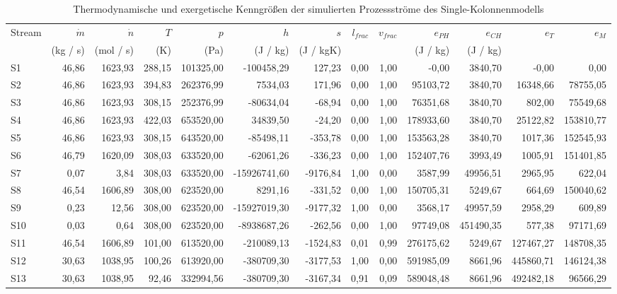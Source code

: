 \begin{longtable}{lrrrrrrrrrrrr}
\caption{Thermodynamische und exergetische Kenngrößen der simulierten Prozessströme des Single-Kolonnenmodells} \\
\hline
Stream & $\dot m$ & $\dot n$ & $T$ & $p$ & $h$ & $s$ & $l_{frac}$ & $v_{frac}$ & $e_{PH}$ & $e_{CH}$ & $e_T$ & $e_M$ \\
 & (kg / s) & (mol / s) & (K) & (Pa) & (J / kg) & (J / kgK) &  &  & (J / kg) & (J / kg) &  &  \\
\hline
S1 & 46,86 & 1623,93 & 288,15 & 101325,00 & -100458,29 & 127,23 & 0,00 & 1,00 & -0,00 & 3840,70 & -0,00 & 0,00 \\
S2 & 46,86 & 1623,93 & 394,83 & 262376,99 & 7534,03 & 171,96 & 0,00 & 1,00 & 95103,72 & 3840,70 & 16348,66 & 78755,05 \\
S3 & 46,86 & 1623,93 & 308,15 & 252376,99 & -80634,04 & -68,94 & 0,00 & 1,00 & 76351,68 & 3840,70 & 802,00 & 75549,68 \\
S4 & 46,86 & 1623,93 & 422,03 & 653520,00 & 34839,50 & -24,20 & 0,00 & 1,00 & 178933,60 & 3840,70 & 25122,82 & 153810,77 \\
S5 & 46,86 & 1623,93 & 308,15 & 643520,00 & -85498,11 & -353,78 & 0,00 & 1,00 & 153563,28 & 3840,70 & 1017,36 & 152545,93 \\
S6 & 46,79 & 1620,09 & 308,03 & 633520,00 & -62061,26 & -336,23 & 0,00 & 1,00 & 152407,76 & 3993,49 & 1005,91 & 151401,85 \\
S7 & 0,07 & 3,84 & 308,03 & 633520,00 & -15926741,60 & -9176,84 & 1,00 & 0,00 & 3587,99 & 49956,51 & 2965,95 & 622,04 \\
S8 & 46,54 & 1606,89 & 308,00 & 623520,00 & 8291,16 & -331,52 & 0,00 & 1,00 & 150705,31 & 5249,67 & 664,69 & 150040,62 \\
S9 & 0,23 & 12,56 & 308,00 & 623520,00 & -15927019,30 & -9177,32 & 1,00 & 0,00 & 3568,17 & 49957,59 & 2958,29 & 609,89 \\
S10 & 0,03 & 0,64 & 308,00 & 623520,00 & -8938687,26 & -262,56 & 0,00 & 1,00 & 97749,08 & 451490,35 & 577,38 & 97171,69 \\
S11 & 46,54 & 1606,89 & 101,00 & 613520,00 & -210089,13 & -1524,83 & 0,01 & 0,99 & 276175,62 & 5249,67 & 127467,27 & 148708,35 \\
S12 & 30,63 & 1038,95 & 100,26 & 613920,00 & -380709,30 & -3177,53 & 1,00 & 0,00 & 591985,09 & 8661,96 & 445860,71 & 146124,38 \\
S13 & 30,63 & 1038,95 & 92,46 & 332994,56 & -380709,30 & -3167,34 & 0,91 & 0,09 & 589048,48 & 8661,96 & 492482,18 & 96566,29 \\

\end{longtable}
